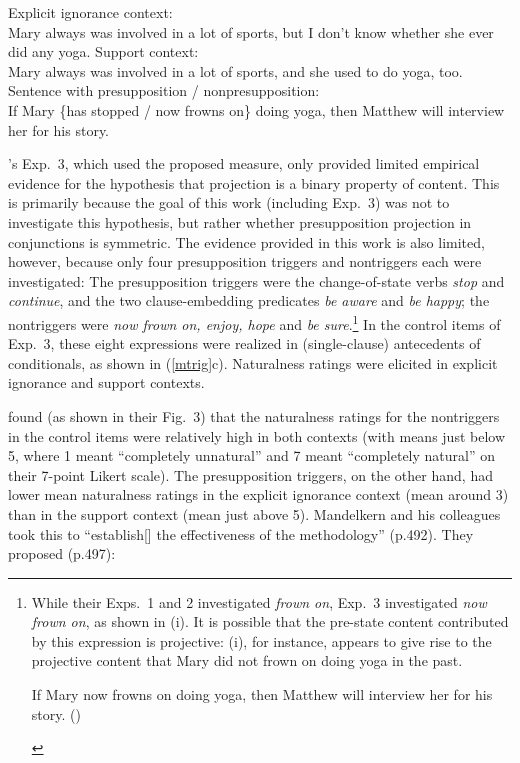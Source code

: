 \documentclass[11pt,fleqn]{article}
\newcommand{\6}{\mbox{$[\hspace*{-.6mm}[$}}
\newcommand{\9}{\mbox{$]\hspace*{-.6mm}]$}}
\newcommand{\citepos}[1]{\citeauthor{#1}'s \citeyear{#1}}
\begin{document}
\begin{exe}
\ex\label{mtrig} \citealt[490f.]{mandelkern-etal2020}
\begin{xlist}
\ex Explicit ignorance context: \\ Mary always was involved in a lot of sports, but I don't know whether she ever did any yoga.
\ex Support context: \\ Mary always was involved in a lot of sports, and she used to do yoga, too.
\ex Sentence with presupposition / nonpresupposition: \\ If Mary \{has stopped / now frowns on\} doing yoga, then Matthew will interview her for his story.
\end{xlist}
\end{exe}
\citepos{mandelkern-etal2020} Exp.~3, which used the proposed measure, only provided limited empirical evidence for the hypothesis that projection is a binary property of content. This is primarily because the goal of this work (including Exp.~3) was not to investigate this hypothesis, but rather whether presupposition projection in conjunctions is symmetric. The evidence provided in this work is also limited, however, because only four presupposition triggers and nontriggers each were investigated: The presupposition triggers were the change-of-state verbs {\em stop} and {\em continue}, and the two clause-embedding predicates {\em be aware} and {\em be happy}; the nontriggers were {\em now frown on, enjoy, hope} and {\em be sure}.\footnote{While their Exps.~1 and 2 investigated {\em frown on}, Exp.~3 investigated {\em now frown on}, as shown in (i). It is possible that the pre-state content contributed by this expression is projective: (i), for instance, appears to give rise to the projective content that Mary did not frown on doing yoga in the past. 

\begin{exe}
 If Mary now frowns on doing yoga, then Matthew will interview her for his story. \hfill (\citealt[491]{mandelkern-etal2020})
\end{exe}
} In the control items of Exp.~3, these eight expressions were realized in (single-clause) antecedents of conditionals, as shown in (\ref{mtrig}c). Naturalness ratings were elicited in explicit ignorance and support contexts. 

\citealt{mandelkern-etal2020} found (as shown in their Fig.~3) that the naturalness ratings for the nontriggers in the control items were relatively high in both contexts (with means just below 5, where 1 meant ``completely unnatural'' and 7 meant ``completely natural'' on their 7-point Likert scale). The presupposition triggers, on the other hand, had lower mean naturalness ratings in the explicit ignorance context (mean around 3) than in the support context (mean just above 5). Mandelkern and his colleagues took this to ``establish[] the effectiveness of the methodology'' (p.492). They proposed (p.497):
\end{document}

